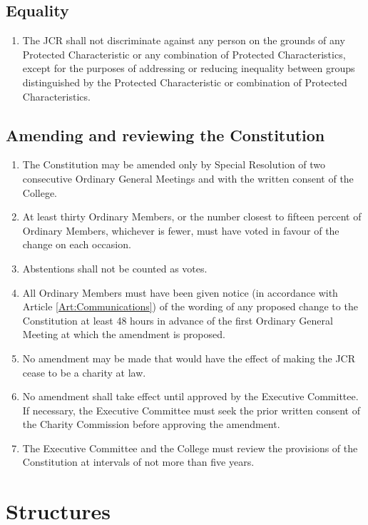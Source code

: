 \documentclass[11pt,a4paper, oneside]{memoir}
\begin{document}
	\section{Equality} \label{Art:Equality}
	\begin{enumerate}
		\item The JCR shall not discriminate against any person on the grounds of any Protected Characteristic or any combination of Protected Characteristics, except for the purposes of addressing or reducing inequality between groups distinguished by the Protected Characteristic or combination of Protected Characteristics.
	\end{enumerate}
	\section{Amending and reviewing the Constitution} \label{Art:Constitution}
	\begin{enumerate}
		\item The Constitution may be amended only by Special Resolution of two consecutive Ordinary General Meetings and with the written consent of the College.
		\item At least thirty Ordinary Members, or the number closest to fifteen percent of Ordinary Members, whichever is fewer, must have voted in favour of the change on each occasion.
		\item Abstentions shall not be counted as votes.
		\item All Ordinary Members must have been given notice (in accordance with Article \ref{Art:Communications}) of the wording of any proposed change to the Constitution at least 48 hours in advance of the first Ordinary General Meeting at which the amendment is proposed.
		\item No amendment may be made that would have the effect of making the JCR cease to be a charity at law.
		\item No amendment shall take effect until approved by the Executive Committee.  If necessary, the Executive Committee must seek the prior written consent of the Charity Commission before approving the amendment.
		\item The Executive Committee and the College must review the provisions of the Constitution at intervals of not more than five years.
	\end{enumerate}
	\chapter{Structures}
\end{document}
